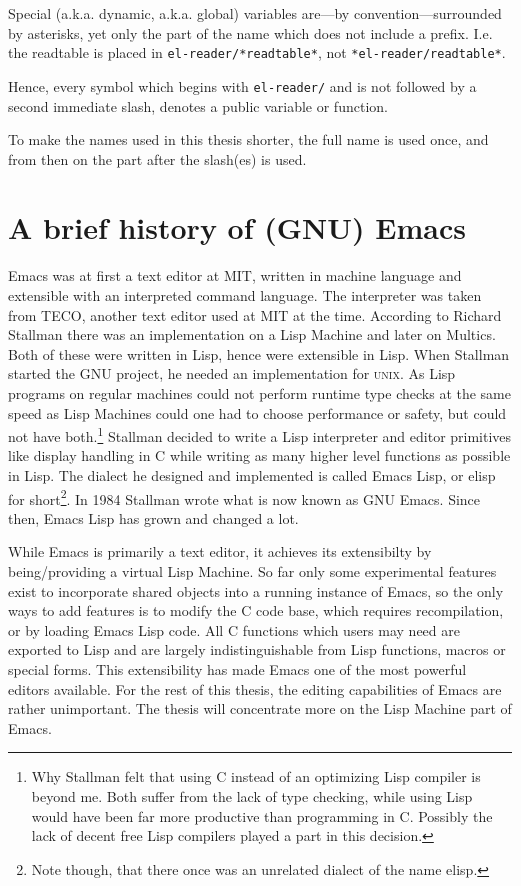 \documentclass[a4paper,10pt,twoside]{report}
\newcommand{\el}{Emacs Lisp}
\newcommand{\sym}[1]{\texttt{#1}}
\newcommand{\unix}{\textsc{unix}}
\begin{document}
Special (a.k.a. dynamic, a.k.a. global) variables are---by
convention---surrounded by asterisks, yet only the part of the name which does
not include a prefix.  I.e. the readtable is placed in
\sym{el-reader/*readtable*}, not \sym{*el-reader/readtable*}.

Hence, every symbol which begins with \sym{el-reader/} and is not followed by a
second immediate slash, denotes a public variable or function.

To make the names used in this thesis shorter, the full name is used once, and
from then on the part after the slash(es) is used.

\chapter{A brief history of (GNU) Emacs}
\label{chapter:emacs-intro}

Emacs was at first a text editor at MIT, written in machine language and
extensible with an interpreted command language.  The interpreter was taken from
TECO, another text editor used at MIT at the time.  According to Richard
Stallman \cite{emacs-hist} there was an implementation on a Lisp Machine and
later on Multics.  Both of these were written in Lisp, hence were extensible in
Lisp.  When Stallman started the GNU project, he needed an implementation for
\unix{}.  As Lisp programs on regular machines could not perform runtime type
checks at the same speed as Lisp Machines could one had to choose performance
or safety, but could not have both.\footnote{Why Stallman felt that using C
  instead of an optimizing Lisp compiler is beyond me.  Both suffer from the
  lack of type checking, while using Lisp would have been far more productive
  than programming in C.  Possibly the lack of decent free Lisp compilers played
  a part in this decision.} Stallman decided to write a Lisp interpreter and
editor primitives like display handling in C while writing as many higher level
functions as possible in Lisp.  The dialect he designed and implemented is
called \el{}, or elisp for short\footnote{Note though, that there once was an
  unrelated dialect of the name elisp.}.  In 1984 Stallman wrote what is now
known as GNU Emacs\cite{emacs-first-release}. Since then, \el{} has grown and
changed a lot.

While Emacs is primarily a text editor, it achieves its extensibilty by
being/providing a virtual Lisp Machine.  So far only some experimental features
exist to incorporate shared objects into a running instance of Emacs, so the
only ways to add features is to modify the C code base, which requires
recompilation, or by loading \el{} code.  All C functions which users may need
are exported to Lisp and are largely indistinguishable from Lisp functions,
macros or special forms.  This extensibility has made Emacs one of the most
powerful editors available.  For the rest of this thesis, the editing
capabilities of Emacs are rather unimportant.  The thesis will concentrate more
on the Lisp Machine part of Emacs.
\end{document}
